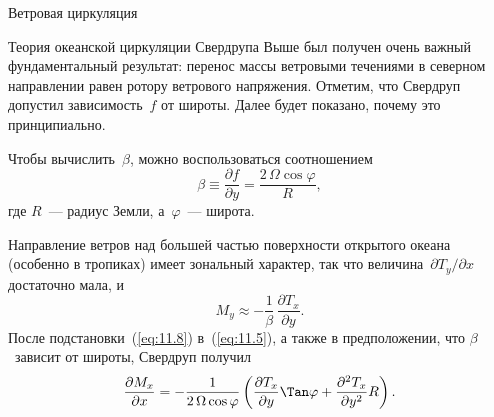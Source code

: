 \begin{chapter}{Ветровая циркуляция}
\begin{section}{Теория океанской циркуляции Свердрупа}
Выше был получен очень важный фундаментальный результат: перенос массы 
ветровыми течениями в северном 
направлении равен ротору ветрового
напряжения. Отметим, что Свердруп допустил зависимость~$f$ от широты. Далее
будет показано, почему это принципиально.
%

Чтобы вычислить~$\beta $, можно воспользоваться соотношением
\begin{equation}\label{eq:11.7}
\beta \equiv \frac{\partial{f}}{\partial{y}} 
  = \frac{2\,\Omega\cos\varphi}{R},
\end{equation}
где $R$~--- радиус Земли, а~$\varphi$~--- широта.
%

Направление ветров над большей частью поверхности открытого океана 
(особенно в тропиках) имеет зональный характер, так что
величина~$\partial{T_y}/\partial{x}$ достаточно мала, и
\begin{equation}\label{eq:11.8}
 M_y \approx -\frac{1}{\beta}\,\frac{\partial T_x}{\partial y}.
\end{equation}
После подстановки~(\ref{eq:11.8}) в~(\ref{eq:11.5}), а также в предположении,
что $\beta$~зависит от широты, Свердруп получил
\begin{equation}
\frac{\partial{M_x}}{\partial{x}}
  =-\frac{1}{2\,\Omega\cos\varphi}
    \left(\frac{\partial{T_x}}{\partial{y}}\Tan\varphi 
      + \frac{\partial^2{T_x}}{\partial{y}^2}R \right).
\end{equation}
%


\end{section}
\end{chapter}
